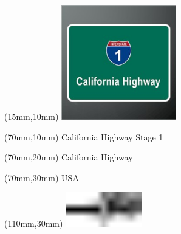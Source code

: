 \null\newpage
\begin{textblock*}{50mm}(15mm,10mm)%
\includegraphics[width=50mm]{LG/2015-05-20_00077.png}
\end{textblock*}
\begin{textblock*}{130mm}(70mm,10mm)%
{\fontsize{20}{20}\selectfont California Highway Stage 1}\\
\end{textblock*}
\begin{textblock*}{120mm}(70mm,20mm)%
{\fontsize{16}{16}\selectfont California Highway}\\
\end{textblock*}
\begin{textblock*}{120mm}(70mm,30mm)%
{\fontsize{12}{12}\selectfont USA}
\end{textblock*}
\begin{textblock*}{30mm}(110mm,30mm)%
\centering
\includegraphics[height=15mm]{icons/tofinish.pdf}
\end{textblock*}
